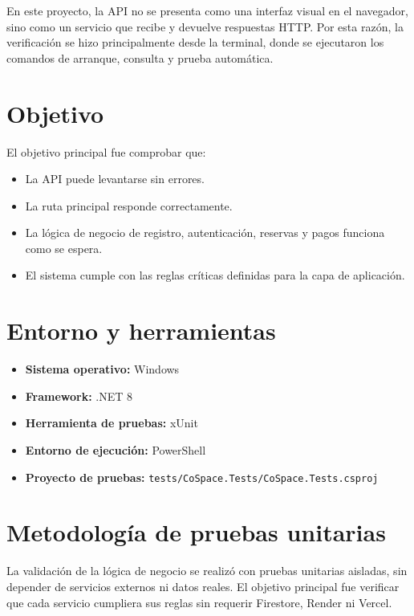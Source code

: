 \documentclass[11pt,a4paper]{report}
\begin{document}
En este proyecto, la API no se presenta como una interfaz visual en el navegador, sino como un servicio que recibe y devuelve respuestas HTTP. Por esta razón, la verificación se hizo principalmente desde la terminal, donde se ejecutaron los comandos de arranque, consulta y prueba automática.

\chapter{Objetivo}

\noindent El objetivo principal fue comprobar que:

\begin{itemize}[leftmargin=1.5em,itemsep=0.4em]
    \item La API puede levantarse sin errores.
    \item La ruta principal responde correctamente.
    \item La lógica de negocio de registro, autenticación, reservas y pagos funciona como se espera.
    \item El sistema cumple con las reglas críticas definidas para la capa de aplicación.
\end{itemize}

\chapter{Entorno y herramientas}

\begin{itemize}[leftmargin=1.5em,itemsep=0.4em]
    \item \textbf{Sistema operativo:} Windows
    \item \textbf{Framework:} .NET 8
    \item \textbf{Herramienta de pruebas:} xUnit
    \item \textbf{Entorno de ejecución:} PowerShell
    \item \textbf{Proyecto de pruebas:} \texttt{tests/CoSpace.Tests/CoSpace.Tests.csproj}
\end{itemize}

\chapter{Metodología de pruebas unitarias}

\noindent La validación de la lógica de negocio se realizó con pruebas unitarias aisladas, sin depender de servicios externos ni datos reales. El objetivo principal fue verificar que cada servicio cumpliera sus reglas sin requerir Firestore, Render ni Vercel.
\end{document}
